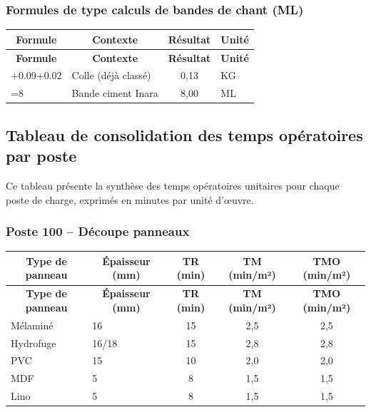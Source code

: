 \documentclass[12pt,a4paper]{article}
\begin{document}
\subsubsection{Formules de type calculs de bandes de chant (ML)}

\begin{longtable}{|p{6cm}|p{5cm}|c|p{3cm}|}
\hline
\multicolumn{1}{|c|}{\textbf{Formule}} & \multicolumn{1}{c|}{\textbf{Contexte}} & \multicolumn{1}{c|}{\textbf{Résultat}} & \multicolumn{1}{c|}{\textbf{Unité}} \\
\hline
\endfirsthead
\hline
\multicolumn{1}{|c|}{\textbf{Formule}} & \multicolumn{1}{c|}{\textbf{Contexte}} & \multicolumn{1}{c|}{\textbf{Résultat}} & \multicolumn{1}{c|}{\textbf{Unité}} \\
\hline
\endhead
\hline
\endfoot
=0.02+0.09+0.02 & Colle (déjà classé) & 0,13 & KG \\
=8 & Bande ciment Inara & 8,00 & ML \\
\hline
\end{longtable}

\subsection{Tableau de consolidation des temps opératoires par poste}

Ce tableau présente la synthèse des temps opératoires unitaires pour chaque poste de charge, exprimés en minutes par unité d'œuvre.

\subsubsection{Poste 100 – Découpe panneaux}

\begin{longtable}{|p{4cm}|p{6cm}|c|c|c|}
\hline
\multicolumn{1}{|c|}{\textbf{Type de panneau}} & \multicolumn{1}{c|}{\textbf{Épaisseur (mm)}} & \multicolumn{1}{c|}{\textbf{TR (min)}} & \multicolumn{1}{c|}{\textbf{TM (min/m²)}} & \multicolumn{1}{c|}{\textbf{TMO (min/m²)}} \\
\hline
\endfirsthead
\hline
\multicolumn{1}{|c|}{\textbf{Type de panneau}} & \multicolumn{1}{c|}{\textbf{Épaisseur (mm)}} & \multicolumn{1}{c|}{\textbf{TR (min)}} & \multicolumn{1}{c|}{\textbf{TM (min/m²)}} & \multicolumn{1}{c|}{\textbf{TMO (min/m²)}} \\
\hline
\endhead
\hline
\endfoot
Mélaminé & 16 & 15 & 2,5 & 2,5 \\
Hydrofuge & 16/18 & 15 & 2,8 & 2,8 \\
PVC & 15 & 10 & 2,0 & 2,0 \\
MDF & 5 & 8 & 1,5 & 1,5 \\
Lino & 5 & 8 & 1,5 & 1,5 \\
\hline
\end{longtable}
\end{document}
